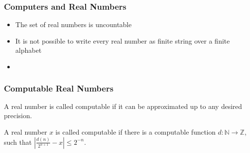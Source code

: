 \documentclass[handout,xcolor=pdftex,dvipsnames,table]{beamer}
\newcommand{\N}{\ensuremath{\mathbb{N}}}
\newcommand{\Z}{\ensuremath{\mathbb{Z}}}
\begin{document}
\begin{frame}
  \frametitle{Computers and Real Numbers}
  \begin{itemize}[<+->]
  \item The set of real numbers is uncountable
    \item It is not possible to write every real number as finite string over a finite alphabet
      \item 
  \end{itemize}
  \end{frame}\begin{frame}
\frametitle{Computable Real Numbers}
  A real number is called computable if it can be approximated up to any desired precision.
  \vfill
  \pause
\begin{minipage}{.45\textwidth}
		\begin{figure}
		\centering
    \vfill
		\end{figure}
	\end{minipage}
	\hfill
	\begin{minipage}{.45\textwidth}
	\begin{definition}
		A real number $x$ is called computable if there is a computable function $d:\N\to\Z$, such that $ \left|\frac{d(n)}{2^{n+1}} - x\right|\leq 2^{-n}$.   
	\end{definition}
	\end{minipage}
\end{frame}
\end{document}
